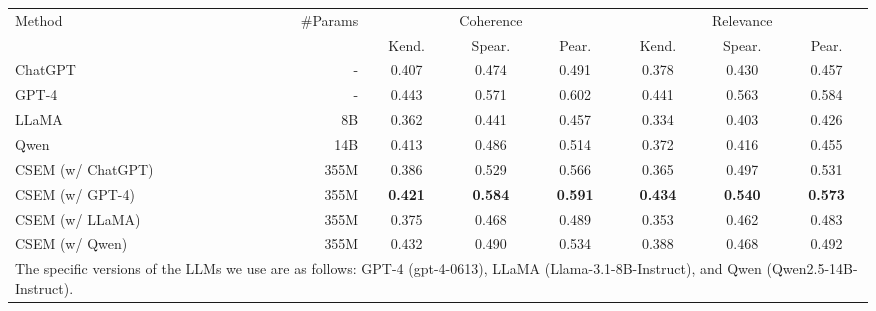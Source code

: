 \begin{tabular}{lrcccccc}
\toprule[1.1pt]
    \multirow{2}{*}{Method} & \multirow{2}{*}{\#Params} & \multicolumn{3}{c}{Coherence} & \multicolumn{3}{c}{Relevance} \\ \cmidrule(l){3-5} \cmidrule(l){6-8}
    & &  Kend. & Spear.& Pear. &  Kend. & Spear.& Pear.  \\ \midrule
    ChatGPT   & - &0.407 &0.474 &0.491 &0.378 &0.430 &0.457    \\ 
    GPT-4     & - &0.443 &0.571 &0.602 &0.441 &0.563 &0.584 \\
    LLaMA     & 8B   &0.362  &0.441   &0.457  & 0.334 & 0.403 & 0.426   \\
    Qwen      & 14B  &0.413  &0.486   &0.514  & 0.372 & 0.416  & 0.455   \\ \hdashline
    CSEM (w/ ChatGPT) &355M &0.386 &0.529 & 0.566 & 0.365 & 0.497& 0.531 \\
    CSEM (w/ GPT-4)   &355M &\textbf{0.421} &\textbf{0.584} &\textbf{0.591} &\textbf{0.434} &\textbf{0.540} &\textbf{0.573}  \\
    CSEM (w/ LLaMA)   &355M &0.375  &0.468   &0.489  & 0.353 & 0.462 & 0.483 \\
    CSEM (w/ Qwen)    &355M &0.432  &0.490   &0.534  & 0.388 & 0.468  & 0.492 \\
    \toprule[1.1pt]
    \multicolumn{8}{l}{\parbox{10cm}{The specific versions of the LLMs we use are as follows: GPT-4 (gpt-4-0613), LLaMA (Llama-3.1-8B-Instruct), and Qwen (Qwen2.5-14B-Instruct).}}
\end{tabular}